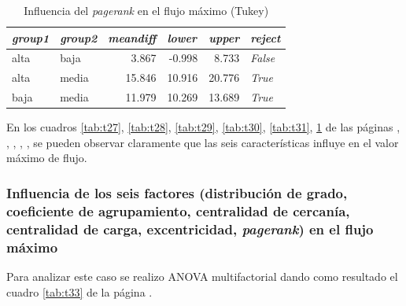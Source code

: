 \documentclass{article}
\begin{document}
\begin{table}[htbp]
  \centering
  \caption{Influencia del \textit{pagerank} en el flujo máximo (Tukey)}
    \begin{tabular}{llrrrl}
    \toprule
    \textit{\textbf{group1}} & \textit{\textbf{group2}} & \multicolumn{1}{l}{\textit{\textbf{meandiff}}} & \multicolumn{1}{l}{\textit{\textbf{lower}}} & \multicolumn{1}{l}{\textit{\textbf{upper}}} & \textit{\textbf{reject}} \\
    \midrule
    alta  & baja  & 3.867 & -0.998 & 8.733 & \textit{False} \\
    alta  & media & 15.846 & 10.916 & 20.776 & \textit{True} \\
    baja  & media & 11.979 & 10.269 & 13.689 & \textit{True} \\
    \bottomrule
    \end{tabular}%
  \label{tab:t32}%
\end{table}%

En los cuadros \ref{tab:t27}, \ref{tab:t28}, \ref{tab:t29}, \ref{tab:t30}, \ref{tab:t31}, \ref{tab:t32} de las páginas \pageref{tab:t27}, \pageref{tab:t28}, \pageref{tab:t29}, \pageref{tab:t30}, \pageref{tab:t31}, \pageref{tab:t32}   se pueden observar claramente que las seis características influye en el valor máximo de flujo.

\subsubsection{Influencia de los seis factores (distribución de grado, coeficiente de agrupamiento, centralidad de cercanía, centralidad de carga, excentricidad, \textit{pagerank}) en el flujo máximo}
Para analizar este caso se realizo ANOVA multifactorial dando como resultado el cuadro \ref{tab:t33} de la página \pageref{tab:t33}.
\end{document}

